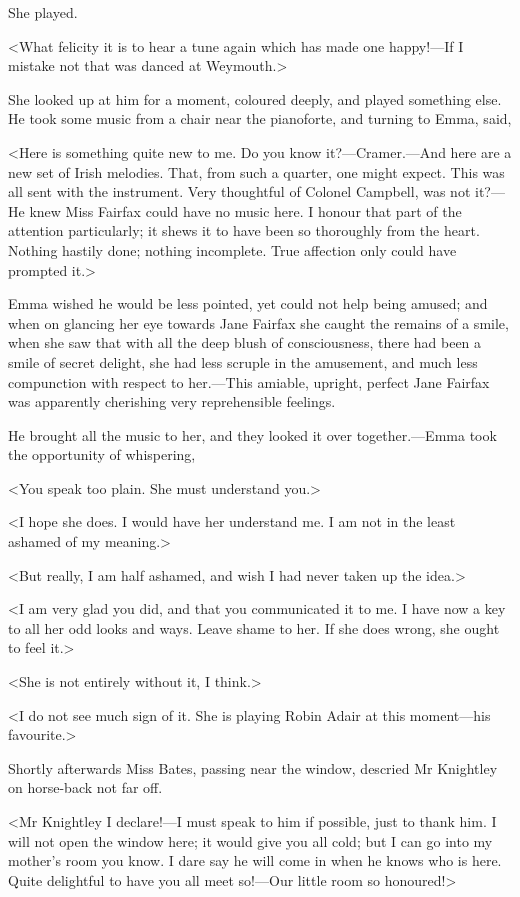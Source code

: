 She played.

<What felicity it is to hear a tune again which has made one happy!—If I mistake not that was danced at Weymouth.>

She looked up at him for a moment, coloured deeply, and played something else. He took some music from a chair near the pianoforte, and turning to Emma, said,

<Here is something quite new to me. Do you know it?—Cramer.—And here are a new set of Irish melodies. That, from such a quarter, one might expect. This was all sent with the instrument. Very thoughtful of Colonel Campbell, was not it?—He knew Miss Fairfax could have no music here. I honour that part of the attention particularly; it shews it to have been so thoroughly from the heart. Nothing hastily done; nothing incomplete. True affection only could have prompted it.>

Emma wished he would be less pointed, yet could not help being amused; and when on glancing her eye towards Jane Fairfax she caught the remains of a smile, when she saw that with all the deep blush of consciousness, there had been a smile of secret delight, she had less scruple in the amusement, and much less compunction with respect to her.—This amiable, upright, perfect Jane Fairfax was apparently cherishing very reprehensible feelings.

He brought all the music to her, and they looked it over together.—Emma took the opportunity of whispering,

<You speak too plain. She must understand you.>

<I hope she does. I would have her understand me. I am not in the least ashamed of my meaning.>

<But really, I am half ashamed, and wish I had never taken up the idea.>

<I am very glad you did, and that you communicated it to me. I have now a key to all her odd looks and ways. Leave shame to her. If she does wrong, she ought to feel it.>

<She is not entirely without it, I think.>

<I do not see much sign of it. She is playing Robin Adair at this moment—his favourite.>

Shortly afterwards Miss Bates, passing near the window, descried Mr Knightley on horse-back not far off.

<Mr Knightley I declare!—I must speak to him if possible, just to thank him. I will not open the window here; it would give you all cold; but I can go into my mother's room you know. I dare say he will come in when he knows who is here. Quite delightful to have you all meet so!—Our little room so honoured!>

